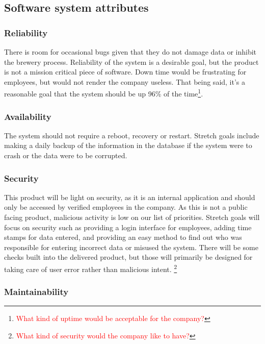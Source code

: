 \documentclass[draftclsnofoot,onecolumn,letterpaper,10pt,compsoc]{IEEEtran}
\newcommand\question[1]{\footnote{\textcolor{red}{#1}}}
\begin{document}
	\subsection{Software system attributes}
		\subsubsection{Reliability}

		There is room for occasional bugs given that they do not damage data or inhibit the brewery process.
		Reliability of the system is a desirable goal, but the product is not a mission critical piece of software.
		Down time would be frustrating for employees, but would not render the company useless.
		That being said, it’s a reasonable goal that the system should be up 96\% of the time\question{What kind of uptime would be acceptable for the company?}.

		\subsubsection{Availability}

		The system should not require a reboot, recovery or restart.
		Stretch goals include making a daily backup of the information in the database if the system were to crash or the data were to be corrupted.

		\subsubsection{Security}

		This product will be light on security, as it is an internal application and should only be accessed by verified employees in the company.
		As this is not a public facing product, malicious activity is low on our list of priorities.
		Stretch goals will focus on security such as providing a login interface for employees, adding time stamps for data entered, and providing an easy method to find out who was responsible for entering incorrect data or misused the system.
		There will be some checks built into the delivered product, but those will primarily be designed for taking care of user error rather than malicious intent.
		\question{What kind of security would the company like to have?}

		\subsubsection{Maintainability}
\end{document}
